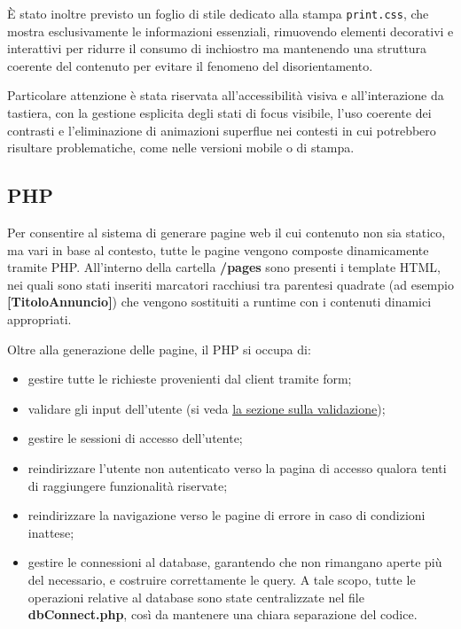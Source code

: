 \documentclass[a4paper,12pt]{article}
\begin{document}
È stato inoltre previsto un foglio di stile dedicato alla stampa \texttt{print.css}, che mostra esclusivamente le informazioni essenziali, rimuovendo elementi decorativi e interattivi per ridurre il consumo di inchiostro ma mantenendo una struttura coerente del contenuto per evitare il fenomeno del disorientamento.

Particolare attenzione è stata riservata all’accessibilità visiva e all’interazione da tastiera, con la gestione esplicita degli stati di focus visibile, l’uso coerente dei contrasti e l’eliminazione di animazioni superflue nei contesti in cui potrebbero risultare problematiche, come nelle versioni mobile o di stampa.

\subsection{PHP}
Per consentire al sistema di generare pagine web il cui contenuto non sia statico,
ma vari in base al contesto, tutte le pagine vengono composte dinamicamente tramite PHP.
All'interno della cartella \textbf{/pages} sono presenti i template HTML, nei quali sono stati
inseriti marcatori racchiusi tra parentesi quadrate (ad esempio \textbf{[TitoloAnnuncio]}) che vengono sostituiti a runtime con i contenuti dinamici appropriati.

Oltre alla generazione delle pagine, il PHP si occupa di:
\begin{itemize}
    \item gestire tutte le richieste provenienti dal client tramite form;
    \item validare gli input dell'utente (si veda \underline{\hyperref[sviluppo:validazione]{la sezione sulla validazione}});
    \item gestire le sessioni di accesso dell'utente;
    \item reindirizzare l'utente non autenticato verso la pagina di accesso qualora tenti di raggiungere funzionalità riservate;
    \item reindirizzare la navigazione verso le pagine di errore in caso di condizioni inattese;
    \item gestire le connessioni al database, garantendo che non rimangano aperte più del necessario, e costruire correttamente le query.
          A tale scopo, tutte le operazioni relative al database sono state centralizzate nel file \textbf{dbConnect.php}, così da mantenere una chiara separazione del codice.
\end{itemize}
\end{document}
